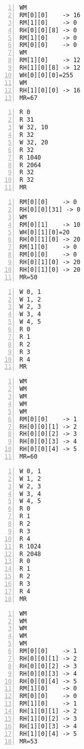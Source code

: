 \documentclass[11pt,a4paper, spanish]{article}
\begin{document}
\begin{lstlisting}[numbers=left, tabsize=2, basicstyle=\fontsize{11}{13}\ttfamily, frame=single, caption={Resultado prueba1.mem}]
WM
RM[0][0]    -> 16
RM[1][0]    -> 0
RH[0][0][8] -> 0
RM[1][0]    -> 0
RM[0][0]    -> 0
WM
RM[1][0]    -> 12
RH[1][0][8] -> 12
WH[0][0][0]=255
WM
RH[1][0][0] -> 16
MR=67
\end{lstlisting}

\begin{lstlisting}[numbers=left, tabsize=2, basicstyle=\fontsize{11}{13}\ttfamily, frame=single, caption={prueba2.mem}]
R 0
R 31
W 32, 10
R 32
W 32, 20
R 32
R 1040
R 2064
R 32
R 32
MR
\end{lstlisting}

\begin{lstlisting}[numbers=left, tabsize=2, basicstyle=\fontsize{11}{13}\ttfamily, frame=single, caption={Resultado prueba2.mem}]
RM[0][0]    -> 0
RH[0][0][31] -> 0
WM
RM[0][1]    -> 10
WH[0][1][0]=20
RH[0][1][0] -> 20
RM[1][0]    -> 0
RM[0][0]    -> 0
RH[0][1][0] -> 20
RH[0][1][0] -> 20
MR=50
\end{lstlisting}

\begin{lstlisting}[numbers=left, tabsize=2, basicstyle=\fontsize{11}{13}\ttfamily, frame=single, caption={prueba3.mem}]
W 0, 1
W 1, 2
W 2, 3
W 3, 4
W 4, 5
R 0
R 1
R 2
R 3
R 4
MR
\end{lstlisting}

\begin{lstlisting}[numbers=left, tabsize=2, basicstyle=\fontsize{11}{13}\ttfamily, frame=single, caption={Resultado prueba3.mem}]
WM
WM
WM
WM
WM
RM[0][0]    -> 1
RH[0][0][1] -> 2
RH[0][0][2] -> 3
RH[0][0][3] -> 4
RH[0][0][4] -> 5
MR=60
\end{lstlisting}

\begin{lstlisting}[numbers=left, tabsize=2, basicstyle=\fontsize{11}{13}\ttfamily, frame=single, caption={prueba4.mem}]
W 0, 1
W 1, 2
W 2, 3
W 3, 4
W 4, 5
R 0
R 1
R 2
R 3
R 4
R 1024
R 2048
R 0
R 1
R 2
R 3
R 4
MR
\end{lstlisting}

\begin{lstlisting}[numbers=left, tabsize=2, basicstyle=\fontsize{11}{13}\ttfamily, frame=single, caption={Resultado prueba4.mem}]
WM
WM
WM
WM
WM
RM[0][0]    -> 1
RH[0][0][1] -> 2
RH[0][0][2] -> 3
RH[0][0][3] -> 4
RH[0][0][4] -> 5
RM[1][0]    -> 0
RM[0][0]    -> 0
RM[1][0]    -> 1
RH[1][0][1] -> 2
RH[1][0][2] -> 3
RH[1][0][3] -> 4
RH[1][0][4] -> 5
MR=53
\end{lstlisting}
\end{document}
